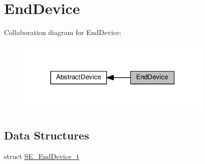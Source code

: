 \hypertarget{group__EndDevice}{}\section{End\+Device}
\label{group__EndDevice}
Collaboration diagram for End\+Device\+:\nopagebreak
\begin{figure}[H]
\begin{center}
\leavevmode
\includegraphics[width=265pt]{group__EndDevice}
\end{center}
\end{figure}
\subsection*{Data Structures}
\begin{DoxyCompactItemize}
\item 
struct \hyperlink{structSE__EndDevice__t}{S\+E\+\_\+\+End\+Device\+\_\+t}
\end{DoxyCompactItemize}
